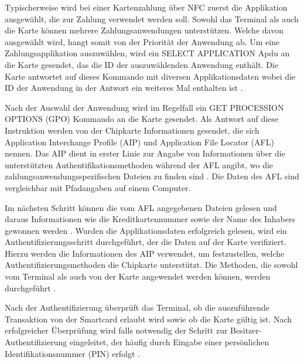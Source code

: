 Typischerweise wird bei einer Kartenzahlung über NFC zuerst die Applikation ausgewählt, die zur Zahlung verwendet werden soll. Sowohl das Terminal als auch die Karte können mehrere Zahlungsanwendungen unterstützen. Welche davon ausgewählt wird, hangt somit von der Priorität der Anwendung ab. Um eine Zahlungsapplikation auszuwählen, wird ein SELECT APPLICATION Apdu an die Karte gesendet, das die ID der auszuwählenden Anwendung enthält. Die Karte antwortet auf dieses Kommando mit diversen Applikationsdaten wobei die ID der Anwendung in der Antwort ein weiteres Mal enthalten ist \cite{getInfoEmvJava, emvbook3}.

Nach der Auswahl der Anwendung wird im Regelfall ein GET PROCESSION OPTIONS (GPO) Kommando an die Karte gesendet. Als Antwort auf diese Instruktion werden von der Chipkarte Informationen gesendet, die sich Application Interchange Profile (AIP) und Application File Locator (AFL) nennen. Das AIP dient in erster Linie zur Angabe von Informationen über die unterstützten Authentifikationsmethoden während der AFL angibt,  wo die zahlungsanwendungsspezifischen Dateien zu finden sind \cite{getInfoEmvJava, emvbook3}. Die Daten des AFL sind vergleichbar mit Pfadangaben auf einem Computer. 

Im nächsten Schritt können die vom AFL angegebenen Dateien gelesen und daraus Informationen wie die Kreditkartennummer sowie der Name des Inhabers gewonnen werden \cite{getInfoEmvJava}. Wurden die Applikationsdaten erfolgreich gelesen, wird ein Authentifizierungsschritt durchgeführt, der die Daten auf der Karte verifiziert. Hierzu werden die Informationen des AIP verwendet, um festzustellen, welche Authentifizierungsmethoden die Chipkarte unterstützt. Die Methoden, die sowohl vom Terminal als auch von der Karte angewendet werden können, werden durchgeführt \cite{howemvpaymentworks}. 

Nach der Authentifizierung überprüft das Terminal, ob die auszuführende Transaktion von der Smartcard erlaubt wird sowie ob die Karte gültig ist. Nach erfolgreicher Überprüfung wird falls notwendig der Schritt zur Besitzer-Authentifizierung eingeleitet, der häufig durch Eingabe einer persönlichen Identifikationsnummer (PIN) erfolgt \cite{howemvpaymentworks}.


